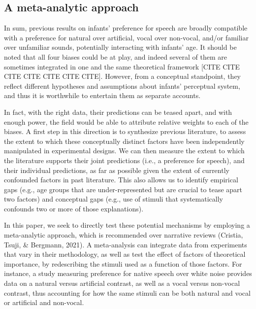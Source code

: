 \documentclass[
  english,
  man]{apa6}
\begin{document}
\hypertarget{a-meta-analytic-approach}{%
\subsection{A meta-analytic approach}\label{a-meta-analytic-approach}}

In sum, previous results on infants' preference for speech are broadly compatible with a preference for natural over artificial, vocal over non-vocal, and/or familiar over unfamiliar sounds, potentially interacting with infants' age. It should be noted that all four biases could be at play, and indeed several of them are sometimes integrated in one and the same theoretical framework {[}CITE CITE CITE CITE CITE CITE CITE{]}. However, from a conceptual standpoint, they reflect different hypotheses and assumptions about infants' perceptual system, and thus it is worthwhile to entertain them as separate accounts.

In fact, with the right data, their predictions can be teased apart, and with enough power, the field would be able to attribute relative weights to each of the biases. A first step in this direction is to synthesize previous literature, to assess the extent to which these conceptually distinct factors have been independently manipulated in experimental designs. We can then measure the extent to which the literature supports their joint predictions (i.e., a preference for speech), and their individual predictions, as far as possible given the extent of currently confounded factors in past literature. This also allows us to identify empirical gaps (e.g., age groups that are under-represented but are crucial to tease apart two factors) and conceptual gaps (e.g., use of stimuli that systematically confounds two or more of those explanations).

In this paper, we seek to directly test these potential mechanisms by employing a meta-analytic approach, which is recommended over narrative reviews (Cristia, Tsuji, \& Bergmann, 2021). A meta-analysis can integrate data from experiments that vary in their methodology, as well as test the effect of factors of theoretical importance, by redescribing the stimuli used as a function of those factors. For instance, a study measuring preference for native speech over white noise provides data on a natural versus artificial contrast, as well as a vocal versus non-vocal contrast, thus accounting for how the same stimuli can be both natural and vocal or artificial and non-vocal.
\end{document}
